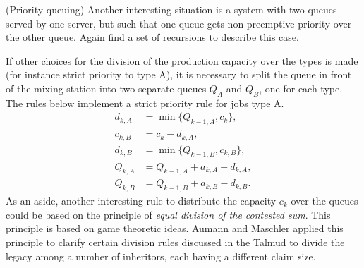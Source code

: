   \begin{question} (Priority queuing) Another interesting situation is
    a system with two queues served by one server, but such that one
    queue gets non-preemptive priority over the other queue. Again
    find a set of recursions to describe this case.
    \begin{solution}
 If other choices for the division of the production capacity
  over the types is made (for instance strict priority to type A), it
  is necessary to split the queue in front of the mixing station into
  two separate queues $Q_A$ and $Q_B$, one for each type.  The rules
  below implement a strict priority rule for jobs type A.
\begin{equation*}
  \begin{split}
    d_{k,A} &= \min\{Q_{k-1, A}, c_k\}, \\
    c_{k,B} &= c_k - d_{k,A}, \\
    d_{k,B} &= \min\{Q_{k-1, B}, c_{k,B}\}, \\
    Q_{k,A} &= Q_{k-1, A} + a_{k,A} - d_{k,A}, \\
    Q_{k,B} &= Q_{k-1, B} + a_{k,B} - d_{k,B}.
  \end{split}
\end{equation*}
As an aside, another interesting rule to distribute the capacity $c_k$
over the queues could be based on the principle of \textit{ equal
  division of the contested sum}. This principle is based on game
theoretic ideas. Aumann and Maschler applied this principle to clarify
certain division rules discussed in the Talmud to divide the legacy
among a number of inheritors, each having a different claim size.
    \end{solution}
\end{question}



